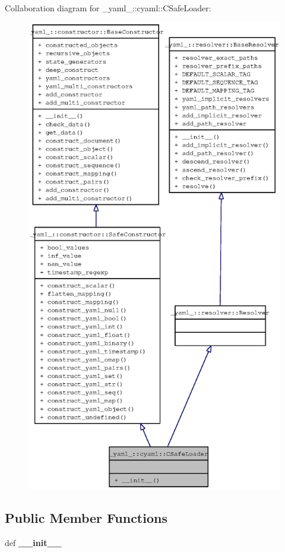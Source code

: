 Collaboration diagram for \_\-yaml\_\-::cyaml::CSafeLoader:\nopagebreak
\begin{figure}[H]
\begin{center}
\leavevmode
\includegraphics[width=400pt]{class__yaml___1_1cyaml_1_1CSafeLoader__coll__graph}
\end{center}
\end{figure}
\subsection*{Public Member Functions}
\begin{CompactItemize}
\item 
def {\bf \_\-\_\-init\_\-\_\-}
\end{CompactItemize}


